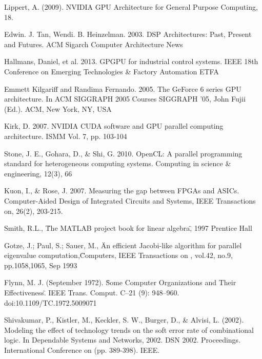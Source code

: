 \newpage
\pagestyle{plain}


\begin{thebibliography}{99}

 Lippert, A. (2009). NVIDIA GPU Architecture for General Purpose Computing, 18.

 Edwin. J. Tan, Wendi. B. Heinzelman. 2003. DSP Architectures: Past, Present and Futures. ACM Sigarch Computer Architecture News

 Hallmans, Daniel, et al. 2013. GPGPU for industrial control systems. IEEE 18th Conference on Emerging Technologies \& Factory Automation ETFA

 Emmett Kilgariff and Randima Fernando. 2005. The GeForce 6 series GPU architecture. In ACM SIGGRAPH 2005 Courses SIGGRAPH '05, John Fujii (Ed.). ACM, New York, NY, USA

 Kirk, D. 2007. NVIDIA CUDA software and GPU parallel computing architecture. ISMM Vol. 7, pp. 103-104

 Stone, J. E., Gohara, D., \& Shi, G. 2010. OpenCL: A parallel programming standard for heterogeneous computing systems. Computing in science \& engineering, 12(3), 66

 Kuon, I., \& Rose, J. 2007. Measuring the gap between FPGAs and ASICs. Computer-Aided Design of Integrated Circuits and Systems, IEEE Transactions on, 26(2), 203-215.

Smith, R.L., \"The MATLAB project book for linear algebra\", 1997 Prentice Hall

 Gotze, J.; Paul, S.; Sauer, M., \"An efficient Jacobi-like algorithm for parallel eigenvalue computation,\" Computers, IEEE Transactions on , vol.42, no.9, pp.1058,1065, Sep 1993

Flynn, M. J. (September 1972). \"Some Computer Organizations and Their Effectiveness\". IEEE Trans. Comput. C–21 (9): 948–960. doi:10.1109/TC.1972.5009071

 Shivakumar, P., Kistler, M., Keckler, S. W., Burger, D., \& Alvisi, L. (2002). Modeling the effect of technology trends on the soft error rate of combinational logic. In Dependable Systems and Networks, 2002. DSN 2002. Proceedings. International Conference on (pp. 389-398). IEEE.


\end{thebibliography}
